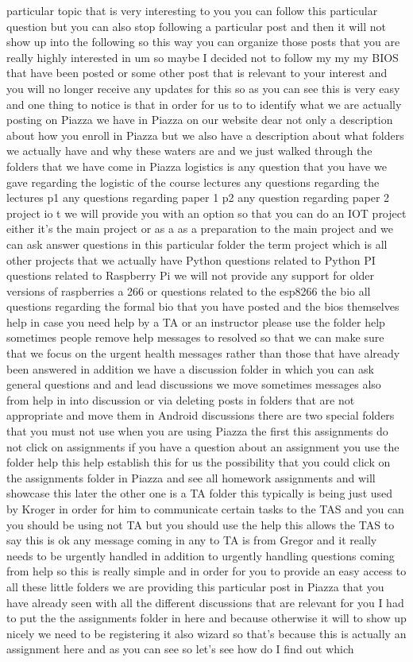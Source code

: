particular topic that is very interesting to you you can follow this particular question but you can also stop following a particular post and then it will not show up into the following so this way you can organize those posts that you are really highly interested in um so maybe I decided not to follow my my my BIOS that have been posted or some other post that is relevant to your interest and you will no longer receive any updates for this so as you can see this is very easy and one thing to notice is that in order for us to to identify what we are actually posting on Piazza we have in Piazza on our website dear not only a description about how you enroll in Piazza but we also have a description about what folders we actually have and why these waters are and we just walked through the folders that we have come in Piazza logistics is any question that you have we gave regarding the logistic of the course lectures any questions regarding the lectures p1 any questions regarding paper 1 p2 any question regarding paper 2 project io t we will provide you with an option so that you can do an IOT project either it's the main project or as a as a preparation to the main project and we can ask answer questions in this particular folder the term project which is all other projects that we actually have Python questions related to Python PI questions related to Raspberry Pi we will not provide any support for older versions of raspberries a 266 or questions related to the esp8266 the bio all questions regarding the formal bio that you have posted and the bios themselves help in case you need help by a TA or an instructor please use the folder help sometimes people remove help messages to resolved so that we can make sure that we focus on the urgent health messages rather than those that have already been answered in addition we have a discussion folder in which you can ask general questions and and lead discussions we move sometimes messages also from help in into discussion or via deleting posts in folders that are not appropriate and move them in Android discussions there are two special folders that you must not use when you are using Piazza the first this assignments do not click on assignments if you have a question about an assignment you use the folder help this help establish this for us the possibility that you could click on the assignments folder in Piazza and see all homework assignments and will showcase this later the other one is a TA folder this typically is being just used by Kroger in order for him to communicate certain tasks to the TAS and you can you should be using not TA but you should use the help this allows the TAS to say this is ok any message coming in any to TA is from Gregor and it really needs to be urgently handled in addition to urgently handling questions coming from help so this is really simple and in order for you to provide an easy access to all these little folders we are providing this particular post in Piazza that you have already seen with all the different discussions that are relevant for you I had to put the the assignments folder in here and because otherwise it will to show up nicely we need to be registering it also wizard so that's because this is actually an assignment here and as you can see so let's see how do I find out which 